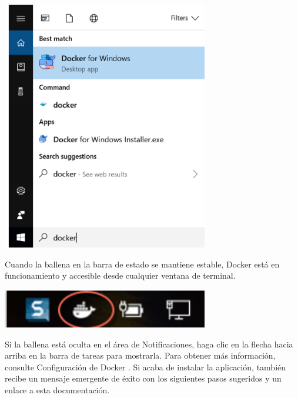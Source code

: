 \documentclass[twoside,onecolumn]{article}
\begin{document}
\begin{flushright}
\begin{itemize}
\begin{center}
		\includegraphics[width=9cm]{./Imagenes/n1}
\end{center}	
Cuando la ballena en la barra de estado se mantiene estable, Docker está en funcionamiento y accesible desde cualquier ventana de terminal.
\begin{center}
		\includegraphics[width=9cm]{./Imagenes/n2}
\end{center}	
Si la ballena está oculta en el área de Notificaciones, haga clic en la flecha hacia arriba en la barra de tareas para mostrarla. Para obtener más información, consulte Configuración de Docker .
Si acaba de instalar la aplicación, también recibe un mensaje emergente de éxito con los siguientes pasos sugeridos y un enlace a esta documentación.
\begin{center}

\end{center}
\end{itemize}
\end{flushright}
\end{document}
